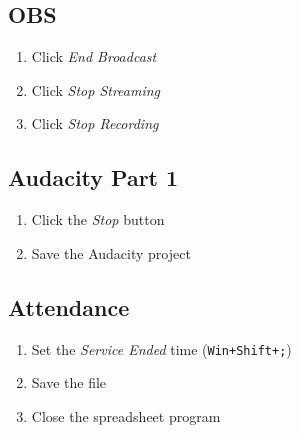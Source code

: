 \documentclass[12pt]{article}
\begin{document}
    \subsection{OBS}
    \begin{enumerate}
        \item Click \emph{End Broadcast}
        \item Click \emph{Stop Streaming}
        \item Click \emph{Stop Recording}
    \end{enumerate}

    \subsection{Audacity Part 1}
    \begin{enumerate}
        \item Click the \emph{Stop} button
        \item Save the Audacity project
    \end{enumerate}

    \subsection{Attendance}
    \begin{enumerate}
        \item Set the \emph{Service Ended} time (\texttt{Win+Shift+;})
        \item Save the file
        \item Close the spreadsheet program
    \end{enumerate}

\end{document}
